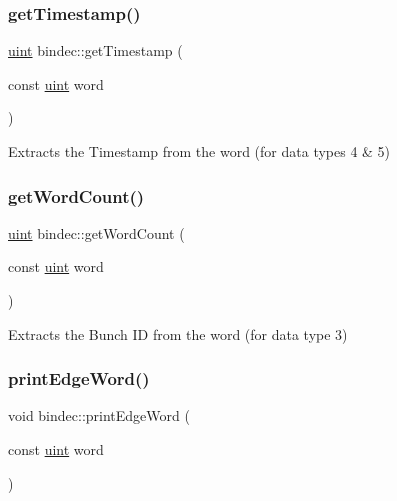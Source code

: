 \subsubsection{\texorpdfstring{get\+Timestamp()}{getTimestamp()}}
{\footnotesize\ttfamily \hyperlink{namespacebindec_a61700e6ffcfc677215bfdf223803e735}{uint} bindec\+::get\+Timestamp (\begin{DoxyParamCaption}\item[{const \hyperlink{namespacebindec_a61700e6ffcfc677215bfdf223803e735}{uint}}]{word }\end{DoxyParamCaption})\hspace{0.3cm}{\ttfamily [inline]}}



Extracts the Timestamp from the word (for data types 4 \& 5) 

\mbox{\label{namespacebindec_a41cf9d8a7714d845128193f21a9e8947}} 
\subsubsection{\texorpdfstring{get\+Word\+Count()}{getWordCount()}}
{\footnotesize\ttfamily \hyperlink{namespacebindec_a61700e6ffcfc677215bfdf223803e735}{uint} bindec\+::get\+Word\+Count (\begin{DoxyParamCaption}\item[{const \hyperlink{namespacebindec_a61700e6ffcfc677215bfdf223803e735}{uint}}]{word }\end{DoxyParamCaption})\hspace{0.3cm}{\ttfamily [inline]}}



Extracts the Bunch ID from the word (for data type 3) 

\mbox{\label{namespacebindec_a54d919f57f0eaa9df57df4b0ad8cdfc6}} 
\subsubsection{\texorpdfstring{print\+Edge\+Word()}{printEdgeWord()}}
{\footnotesize\ttfamily void bindec\+::print\+Edge\+Word (\begin{DoxyParamCaption}\item[{const \hyperlink{namespacebindec_a61700e6ffcfc677215bfdf223803e735}{uint}}]{word }\end{DoxyParamCaption})\hspace{0.3cm}{\ttfamily [inline]}}



